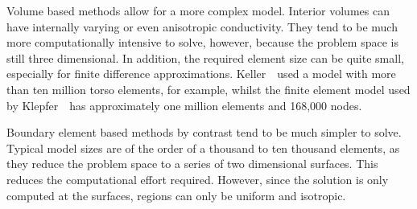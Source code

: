 Volume based methods allow for a more complex model.
Interior volumes can have internally varying or even anisotropic conductivity.
They tend to be much more computationally intensive to solve, however, because
the problem space is still three dimensional.
In addition, the required element size can be quite small, especially for finite
difference approximations.
Keller~\cite{Keller2007}\ used a model with more than ten million torso
elements, for example, whilst the finite element model used by
Klepfer~\cite{Klepfer1997}\ has approximately one million elements and 168,000
nodes.

Boundary element based methods by contrast tend to be much simpler to solve.
Typical model sizes are of the order of a thousand to ten thousand elements, as
they reduce the problem space to a series of two dimensional surfaces.
This reduces the computational effort required.
However, since the solution is only computed at the surfaces, regions can only
be uniform and isotropic.





